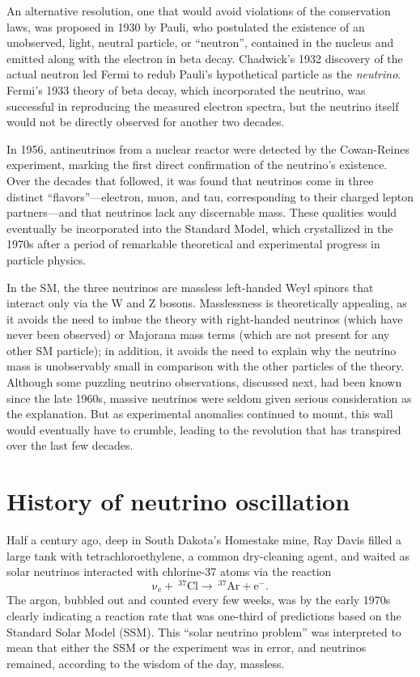 \documentclass[../thesis.tex]{subfiles}
\begin{document}
An alternative resolution, one that would avoid violations of the conservation laws, was proposed in 1930 by Pauli, who postulated the existence of an unobserved, light, neutral particle, or ``neutron'', contained in the nucleus and emitted along with the electron in beta decay. Chadwick's 1932 discovery of the actual neutron led Fermi to redub Pauli's hypothetical particle as the \emph{neutrino}. Fermi's 1933 theory of beta decay, which incorporated the neutrino, was successful in reproducing the measured electron spectra, but the neutrino itself would not be directly observed for another two decades.

In 1956, antineutrinos from a nuclear reactor were detected by the Cowan-Reines experiment, marking the first direct confirmation of the neutrino's existence. Over the decades that followed, it was found that neutrinos come in three distinct ``flavors''---electron, muon, and tau, corresponding to their charged lepton partners---and that neutrinos lack any discernable mass. These qualities would eventually be incorporated into the Standard Model, which crystallized in the 1970s after a period of remarkable theoretical and experimental progress in particle physics.

In the SM, the three neutrinos are massless left-handed Weyl spinors that interact only via the W and Z bosons. Masslessness is theoretically appealing, as it avoids the need to imbue the theory with right-handed neutrinos (which have never been observed) or Majorana mass terms (which are not present for any other SM particle); in addition, it avoids the need to explain why the neutrino mass is unobservably small in comparison with the other particles of the theory. Although some puzzling neutrino observations, discussed next, had been known since the late 1960s, massive neutrinos were seldom given serious consideration as the explanation. But as experimental anomalies continued to mount, this wall would eventually have to crumble, leading to the revolution that has transpired over the last few decades.

\section{History of neutrino oscillation}
\label{sec:history}

Half a century ago, deep in South Dakota's Homestake mine, Ray Davis filled a large tank with tetrachloroethylene, a common dry-cleaning agent, and waited as solar neutrinos interacted with chlorine-37 atoms via the reaction
\[ \mathrm{\nu_e + \ ^{37}Cl \longrightarrow \ ^{37}Ar + e^-.} \]
The argon, bubbled out and counted every few weeks, was by the early 1970s clearly indicating a reaction rate that was one-third of predictions based on the Standard Solar Model (SSM). This ``solar neutrino problem'' was interpreted to mean that either the SSM or the experiment was in error, and neutrinos remained, according to the wisdom of the day, massless.
\end{document}
